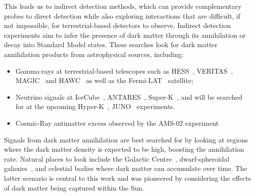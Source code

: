 This leads us to indirect detection methods, which can provide complementary probes to direct detection while also exploring interactions that are difficult, if not impossible, for terrestrial-based detectors to observe.
Indirect detection experiments aim to infer the presence of dark matter through its annihilation or decay into Standard Model states. 
These searches look for dark matter annihilation products from astrophysical sources, including:
\begin{itemize}
    \item Gamma-rays at terrestrial-based telescopes such as HESS~\cite{HESS:2018cbt_may_SearchgRayLine, Montanari:2023bzn_jul_Searchdarkmatter, HESS:2006zwn_ObservationsGalacticCenter}, VERITAS~\cite{VERITAS:2017tif_apr_DarkMatterConstraints, Ryan:2023yzu_jul_SearchDarkMatter, McGrath:2023oto_jul_IndirectsearchDark, Ryan:2023yzu_jul_SearchDarkMatter}, MAGIC~\cite{MAGIC:2009tyk_MAGICGammaRayTelescope, MAGIC:2011nta_SearchesDarkMatter, MAGIC:2011nta_SearchesDarkMatter, MAGIC:2009tyk_MAGICGammaRayTelescope} and HAWC~\cite{HAWC:2017mfa_feb_DarkMatterLimits, HAWC:2017udy_feb_SearchDarkMatter, HAWC:2017udy_feb_SearchDarkMatter, HAWC:2017mfa_feb_DarkMatterLimits, Proper:2015xya_jul_FirstLimitsDark, Harding:2015bua_jul_DarkMatterAnnihilation} as well as the Fermi-LAT~\cite{Fermi-LAT:2015att_nov_SearchingDarkMatter,Fermi-LAT:2015kyq_jun_UpdatedSearchSpectral,Fermi-LAT:2012ugx_FermiLATSearch, Fermi-LAT:2010qeq_ConstraintsCosmologicalDark, Su:2010qj_GiantGammarayBubbles} satellite;

    \item Neutrino signals at IceCube~\cite{IceCube:2016dgk_mar_Searchannihilatingdark, IceCube:2012ugg_mar_Searchdarkmatter}, ANTARES~\cite{ANTARES:2016bxz_jun_SearchDarkMatter,ANTARES:2016obx_may_SearchSecludedDark,ANTARES:2016xuh_aug_LimitsDarkMatter}, Super-K~\cite{Super-Kamiokande:2015xms_apr_Searchneutrinosannihilation,Super-Kamiokande:2004pou_Searchdarkmatter,Feng:2008qn_TestingDarkMatter}, and will be searched for at the upcoming Hyper-K~\cite{Bell:2020rkw_sep_SearchingSubGeVDark,Bell:2021esh_nov_Searchingdarkmatter,Bell:2022ycf_nov_Darkmatterpollution}, JUNO~\cite{Franarin:2018gfk_jun_JUNOSensitivityResonant} experiments.

    \item Cosmic-Ray antimatter excess observed by the AMS-02 experiment~\cite{Giesen:2015ufa_sep_AMS02antiprotonslast, Bergstrom:2013jra_oct_NewLimitsDark}
\end{itemize}

Signals from dark matter annihilation are best searched for by looking at regions where the dark matter density is expected to be high, boosting the annihilation rate. 
Natural places to look include the Galactic Centre~\cite{Ipek:2014gua_sep_RenormalizableModelGalactic, Fermi-LAT:2017opo_may_FermiGalacticCenter}, dwarf-spheroidal galaxies~\cite{Bonnivard:2015xpq_oct_Darkmatterannihilation}, and celestial bodies where dark matter can accumulate over time. The latter scenario is central to this work and was pioneered by considering the effects of dark matter being captured within the Sun.



